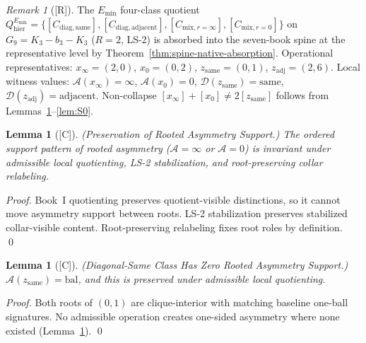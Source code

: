 \documentclass[12pt,oneside]{amsbook}
\theoremstyle{plain}
\newtheorem{lemma}[theorem]{Lemma}
\theoremstyle{definition}
\theoremstyle{remark}
\newtheorem{remark}[theorem]{Remark}
\newcommand{\status}[1]{\textup{[#1]}}
\begin{document}

\begin{remark}[\status{R}]\label{rem:emin-witness-summary}
The $E_{\min}$ four-class quotient
$Q^{E_{\min}}_{\mathrm{hier}} = \{[C_{\mathrm{diag,same}}],
[C_{\mathrm{diag,adjacent}}],[C_{\mathrm{mix},r=\infty}],
[C_{\mathrm{mix},r=0}]\}$ on $G_9 = K_3 - b_3 - K_3$ ($R=2$, LS-2)
is absorbed into the seven-book spine at the representative level by
Theorem~\ref{thm:spine-native-absorption}.  Operational representatives:
$x_\infty=(2,0)$, $x_0=(0,2)$, $z_{\mathrm{same}}=(0,1)$,
$z_{\mathrm{adj}}=(2,6)$.
Local witness values: $\mathcal{A}(x_\infty)=\infty$,
$\mathcal{A}(x_0)=0$, $\mathcal{D}(z_{\mathrm{same}})=\mathrm{same}$,
$\mathcal{D}(z_{\mathrm{adj}})=\mathrm{adjacent}$.
Non-collapse $[x_\infty]+[x_0] \neq 2[z_{\mathrm{same}}]$ follows
from Lemmas~\ref{lem:S0a}--\ref{lem:S0}.
\end{remark}

\begin{lemma}[\status{C}]\label{lem:S0a}
\textup{(Preservation of Rooted Asymmetry Support.)}
The ordered support pattern of rooted asymmetry ($\mathcal{A}=\infty$
or $\mathcal{A}=0$) is invariant under admissible local quotienting,
LS-2 stabilization, and root-preserving collar relabeling.
\end{lemma}

\begin{proof}
Book~I quotienting preserves quotient-visible distinctions, so it
cannot move asymmetry support between roots.  LS-2 stabilization
preserves stabilized collar-visible content.  Root-preserving
relabeling fixes root roles by definition. \qed
\end{proof}

\begin{lemma}[\status{C}]\label{lem:S0b}
\textup{(Diagonal-Same Class Has Zero Rooted Asymmetry Support.)}
$\mathcal{A}(z_{\mathrm{same}}) = \mathrm{bal}$, and this is
preserved under admissible local quotienting.
\end{lemma}

\begin{proof}
Both roots of $(0,1)$ are clique-interior with matching baseline
one-ball signatures.  No admissible operation creates one-sided
asymmetry where none existed (Lemma~\ref{lem:S0a}). \qed
\end{proof}
\end{document}
